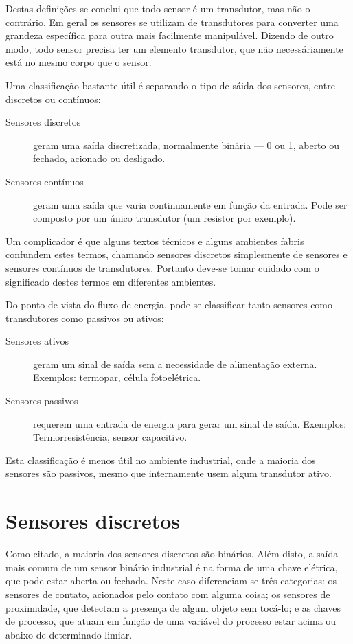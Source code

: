 Destas definições se conclui que todo sensor é um transdutor, mas não o contrário. Em geral os sensores se utilizam de transdutores para converter uma grandeza específica para outra mais facilmente manipulável. Dizendo de outro modo, todo sensor precisa ter um elemento transdutor, que não necessáriamente está no mesmo corpo que o sensor.

Uma classificação bastante útil é separando o tipo de sáida dos sensores, entre discretos ou contínuos:

\begin{description}
  \item[Sensores discretos] geram uma saída discretizada, normalmente binária --- 0 ou 1, aberto ou fechado, acionado ou desligado.
  \item[Sensores contínuos] geram uma saída que varia continuamente em função da entrada. Pode ser composto por um único transdutor (um resistor por exemplo).
\end{description}

Um complicador é que alguns textos técnicos e alguns ambientes fabris confundem estes termos, chamando sensores discretos simplesmente de sensores e sensores contínuos de transdutores. Portanto deve-se tomar cuidado com o significado destes termos em diferentes ambientes.

Do ponto de vista do fluxo de energia, pode-se classificar tanto sensores como transdutores como passivos ou ativos:
\begin{description}
  \item[Sensores ativos] geram um sinal de saída sem a necessidade de alimentação externa. Exemplos: termopar, célula fotoelétrica.
  \item[Sensores passivos] requerem uma entrada de energia para gerar um sinal de saída. Exemplos: Termorresistência, sensor capacitivo.
\end{description}

Esta classificação é menos útil no ambiente industrial, onde a maioria dos sensores são passivos, mesmo que internamente usem algum transdutor ativo.

\section{Sensores discretos}

Como citado, a maioria dos sensores discretos são binários. Além disto, a saída mais comum de um sensor binário industrial é na forma de uma chave elétrica, que pode estar aberta ou fechada. Neste caso diferenciam-se três categorias: os sensores de contato, acionados pelo contato com alguma coisa; os sensores de proximidade, que detectam a presença de algum objeto sem tocá-lo; e as chaves de processo, que atuam em função de uma variável do processo estar acima ou abaixo de determinado limiar.

